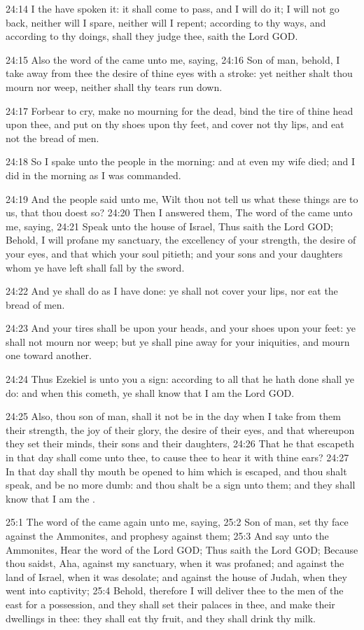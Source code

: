 24:14 I the \LORD have spoken it: it shall come to pass, and I will do it; I will not go back, neither will I spare, neither will I repent; according to thy ways, and according to thy doings, shall they judge thee, saith the Lord GOD.

24:15 Also the word of the \LORD came unto me, saying, 24:16 Son of man, behold, I take away from thee the desire of thine eyes with a stroke: yet neither shalt thou mourn nor weep, neither shall thy tears run down.

24:17 Forbear to cry, make no mourning for the dead, bind the tire of thine head upon thee, and put on thy shoes upon thy feet, and cover not thy lips, and eat not the bread of men.

24:18 So I spake unto the people in the morning: and at even my wife died; and I did in the morning as I was commanded.

24:19 And the people said unto me, Wilt thou not tell us what these things are to us, that thou doest so?  24:20 Then I answered them, The word of the \LORD came unto me, saying, 24:21 Speak unto the house of Israel, Thus saith the Lord GOD; Behold, I will profane my sanctuary, the excellency of your strength, the desire of your eyes, and that which your soul pitieth; and your sons and your daughters whom ye have left shall fall by the sword.

24:22 And ye shall do as I have done: ye shall not cover your lips, nor eat the bread of men.

24:23 And your tires shall be upon your heads, and your shoes upon your feet: ye shall not mourn nor weep; but ye shall pine away for your iniquities, and mourn one toward another.

24:24 Thus Ezekiel is unto you a sign: according to all that he hath done shall ye do: and when this cometh, ye shall know that I am the Lord GOD.

24:25 Also, thou son of man, shall it not be in the day when I take from them their strength, the joy of their glory, the desire of their eyes, and that whereupon they set their minds, their sons and their daughters, 24:26 That he that escapeth in that day shall come unto thee, to cause thee to hear it with thine ears?  24:27 In that day shall thy mouth be opened to him which is escaped, and thou shalt speak, and be no more dumb: and thou shalt be a sign unto them; and they shall know that I am the \LORD.

25:1 The word of the \LORD came again unto me, saying, 25:2 Son of man, set thy face against the Ammonites, and prophesy against them; 25:3 And say unto the Ammonites, Hear the word of the Lord GOD; Thus saith the Lord GOD; Because thou saidst, Aha, against my sanctuary, when it was profaned; and against the land of Israel, when it was desolate; and against the house of Judah, when they went into captivity; 25:4 Behold, therefore I will deliver thee to the men of the east for a possession, and they shall set their palaces in thee, and make their dwellings in thee: they shall eat thy fruit, and they shall drink thy milk.

